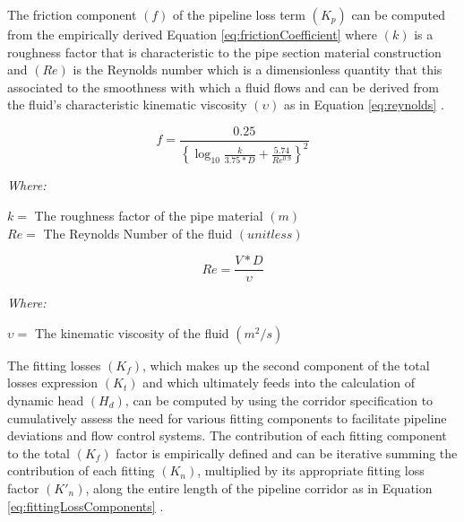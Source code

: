 The friction component $(f)$ of the pipeline loss term $(K_p)$ can be computed from the empirically derived Equation \ref{eq:frictionCoefficient} where $(k)$ is a roughness factor that is characteristic to the pipe section material construction and $(Re)$ is the Reynolds number which is a dimensionless quantity that this associated to the smoothness with which a fluid flows and can be derived from the fluid's characteristic kinematic viscosity $(\upsilon)$ as in Equation \ref{eq:reynolds} \cite{Liu2003}.
       
       \begin{equation}
           f = \frac{0.25}{ \left\{ \log_{10}{ \frac{k}{3.75 * D} + \frac{5.74}{Re^{0.9}} } \right\}^{2} }
           \label{eq:frictionCoefficient}
       \end{equation}
       
       \noindent \textit{Where:} \hfill
       
       \begin{center}
           $k = $ The roughness factor of the pipe material $(m)$ \\
           $Re = $ The Reynolds Number of the fluid $(unitless)$ \\
       \end{center}   
       
       \begin{equation}
           Re = \frac{V * D}{\upsilon}
           \label{eq:reynolds}
       \end{equation}
       
       \noindent \textit{Where:} \hfill
       
       \begin{center}
           $\upsilon = $ The kinematic viscosity of the fluid $(m^2/s)$ \\
       \end{center}   
       
The fitting losses $(K_f)$, which makes up the second component of the total losses expression $(K_t)$ and which ultimately feeds into the calculation of dynamic head $(H_d)$, can be computed by using the corridor specification to cumulatively assess the need for various fitting components to facilitate pipeline deviations and flow control systems. The contribution of each fitting component to the total $(K_f)$ factor is empirically defined and can be iterative summing the contribution of each fitting $(K_n)$, multiplied by its appropriate fitting loss factor $(K'_n)$, along the entire length of the pipeline corridor as in Equation \ref{eq:fittingLossComponents} \cite{Liu2003}.

